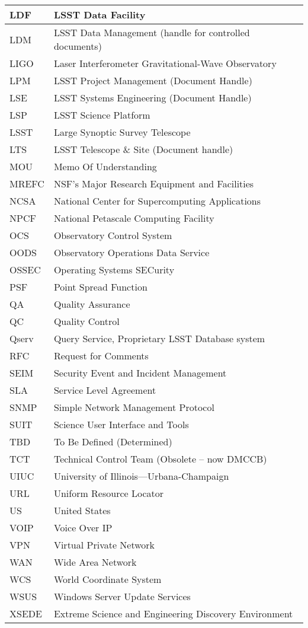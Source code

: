 \begin{longtable}{|l|p{}|}
LDF & LSST Data Facility \\\hline
LDM & LSST Data Management (handle for controlled documents) \\\hline
LIGO & Laser Interferometer Gravitational-Wave Observatory \\\hline
LPM & LSST Project Management (Document Handle) \\\hline
LSE & LSST Systems Engineering (Document Handle) \\\hline
LSP & LSST Science Platform \\\hline
LSST & Large Synoptic Survey Telescope \\\hline
LTS & LSST Telescope \& Site (Document handle) \\\hline
MOU & Memo Of Understanding \\\hline
MREFC & NSF's Major Research Equipment and Facilities \\\hline
NCSA & National Center for Supercomputing Applications \\\hline
NPCF & National Petascale Computing Facility \\\hline
OCS & Observatory Control System \\\hline
OODS & Observatory Operations Data Service \\\hline
OSSEC & Operating Systems SECurity \\\hline
PSF & Point Spread Function \\\hline
QA & Quality Assurance \\\hline
QC & Quality Control \\\hline
Qserv & Query Service, Proprietary LSST Database system \\\hline
RFC & Request for Comments \\\hline
SEIM & Security Event and Incident Management \\\hline
SLA & Service Level Agreement \\\hline
SNMP & Simple Network Management Protocol \\\hline
SUIT & Science User Interface and Tools \\\hline
TBD & To Be Defined (Determined) \\\hline
TCT & Technical Control Team (Obsolete -- now DMCCB) \\\hline
UIUC & University of Illinois—Urbana-Champaign \\\hline
URL & Uniform Resource Locator \\\hline
US & United States \\\hline
VOIP & Voice Over IP \\\hline
VPN & Virtual Private Network \\\hline
WAN & Wide Area Network \\\hline
WCS & World Coordinate System \\\hline
WSUS & Windows Server Update Services \\\hline
XSEDE & Extreme Science and Engineering Discovery Environment \\\hline
\end{longtable}
